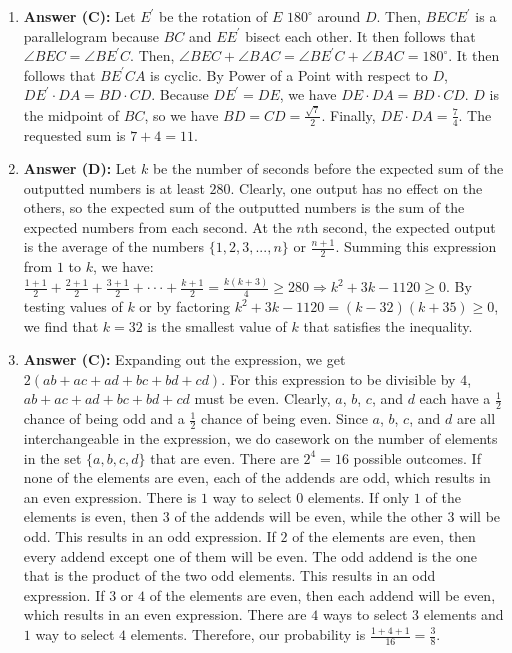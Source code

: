 \documentclass{article}
\begin{document}
\begin{enumerate}
\item \textbf{Answer (C):} Let $E^{\prime}$ be the rotation of $E$ $180^{\circ}$ around $D$. Then, $BECE^{\prime}$ is a parallelogram because $BC$ and $EE^{\prime}$ bisect each other. It then follows that $\angle BEC=\angle BE^{\prime}C$. Then, $\angle BEC+\angle BAC=\angle BE^{\prime}C+\angle BAC=180^{\circ}$. It then follows that $BE^{\prime}CA$ is cyclic. By Power of a Point with respect to $D$, $DE^{\prime}\cdot DA=BD\cdot CD$. Because $DE^{\prime}=DE$, we have $DE\cdot DA=BD\cdot CD$. $D$ is the midpoint of $BC$, so we have $BD=CD=\frac{\sqrt{7}}{2}$. Finally, $DE\cdot DA=\frac{7}{4}$. The requested sum is $7+4=11$.

\item \textbf{Answer (D):} Let $k$ be the number of seconds before the expected sum of the outputted numbers is at least $280$. Clearly, one output has no effect on the others, so the expected sum of the outputted numbers is the sum of the expected numbers from each second. At the $n$th second, the expected output is the average of the numbers $\{1,2,3,..., n\}$ or $\frac{n+1}{2}$. Summing this expression from $1$ to $k$, we have: $\frac{1+1}{2}+\frac{2+1}{2}+\frac{3+1}{2}+\cdot\cdot\cdot+\frac{k+1}{2}=\frac{k(k+3)}{4}\ge280\Rightarrow k^{2}+3k-1120\ge0$. By testing values of $k$ or by factoring $k^{2}+3k-1120=(k-32)(k+35)\ge0$, we find that $k=32$ is the smallest value of $k$ that satisfies the inequality.

\item \textbf{Answer (C):} Expanding out the expression, we get $2(ab+ac+ad+bc+bd+cd)$. For this expression to be divisible by $4$, $ab+ac+ad+bc+bd+cd$ must be even. Clearly, $a$, $b$, $c$, and $d$ each have a $\frac{1}{2}$ chance of being odd and a $\frac{1}{2}$ chance of being even. Since $a$, $b$, $c$, and $d$ are all interchangeable in the expression, we do casework on the number of elements in the set $\{a, b, c, d\}$ that are even. There are $2^{4}=16$ possible outcomes. If none of the elements are even, each of the addends are odd, which results in an even expression. There is $1$ way to select $0$ elements. If only $1$ of the elements is even, then $3$ of the addends will be even, while the other $3$ will be odd. This results in an odd expression. If $2$ of the elements are even, then every addend except one of them will be even. The odd addend is the one that is the product of the two odd elements. This results in an odd expression. If $3$ or $4$ of the elements are even, then each addend will be even, which results in an even expression. There are $4$ ways to select $3$ elements and $1$ way to select $4$ elements. Therefore, our probability is $\frac{1+4+1}{16}=\frac{3}{8}$.


\end{enumerate}
\end{document}
